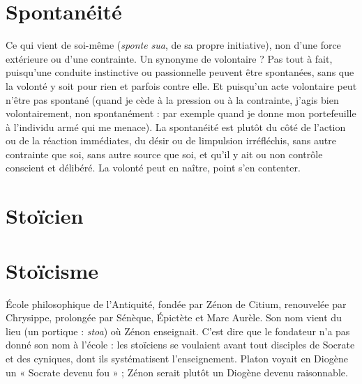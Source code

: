 \section{Spontanéité}
Ce qui vient de soi-même ({\it sponte sua}, de sa propre initiative),
non d’une force extérieure ou d’une contrainte. Un
synonyme de volontaire ? Pas tout à fait, puisqu’une conduite instinctive ou
passionnelle peuvent être spontanées, sans que la volonté y soit pour rien et
parfois contre elle. Et puisqu’un acte volontaire peut n'être pas spontané
(quand je cède à la pression ou à la contrainte, j’agis bien volontairement, non
spontanément : par exemple quand je donne mon portefeuille à l'individu
armé qui me menace). La spontanéité est plutôt du côté de l’action ou de la
réaction immédiates, du désir ou de limpulsion irréfléchis, sans autre
contrainte que soi, sans autre source que soi, et qu’il y ait ou non contrôle conscient
et délibéré. La volonté peut en naître, point s’en contenter.

\section{Stoïcien}

\section{Stoïcisme}
École philosophique de l'Antiquité, fondée par Zénon de Citium,
renouvelée par Chrysippe, prolongée par Sénèque, Épictète et
Marc Aurèle. Son nom vient du lieu (un portique : {\it stoa}) où Zénon enseignait.
C’est dire que le fondateur n’a pas donné son nom à l’école : les stoïciens se
voulaient avant tout disciples de Socrate et des cyniques, dont ils systématisent
l’enseignement. Platon voyait en Diogène un « Socrate devenu fou » ; Zénon
serait plutôt un Diogène devenu raisonnable.

